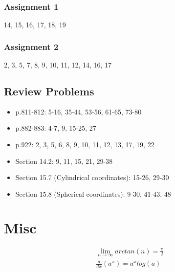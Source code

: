 \documentclass[12 pt]{article}
\theoremstyle{definition}
\begin{document}
\subsubsection{Assignment 1} 14, 15, 16, 17, 18, 19
\subsubsection{Assignment 2} 2, 3, 5, 7, 8, 9, 10, 11, 12, 14, 16, 17
\subsection{Review Problems}
\begin{itemize}
	\item p.811-812: 5-16, 35-44, 53-56, 61-65, 73-80
	\item p.882-883: 4-7, 9, 15-25, 27
	\item p.922: 2, 3, 5, 6, 8, 9, 10, 11, 12, 13, 17, 19, 22
	\item Section 14.2: 9, 11, 15, 21, 29-38
        \item Section 15.7 (Cylindrical coordinates): 15-26, 29-30
        \item Section 15.8 (Spherical coordinates): 9-30, 41-43, 48
\end{itemize}
\section{Misc}
\begin{align}
	& \lim_{n\to \infty}arctan(n)=\frac{\pi}{2}
	\\&\frac{d}{dx}\left(a^x\right)=a^x log(a)
\end{align}
\end{document}
